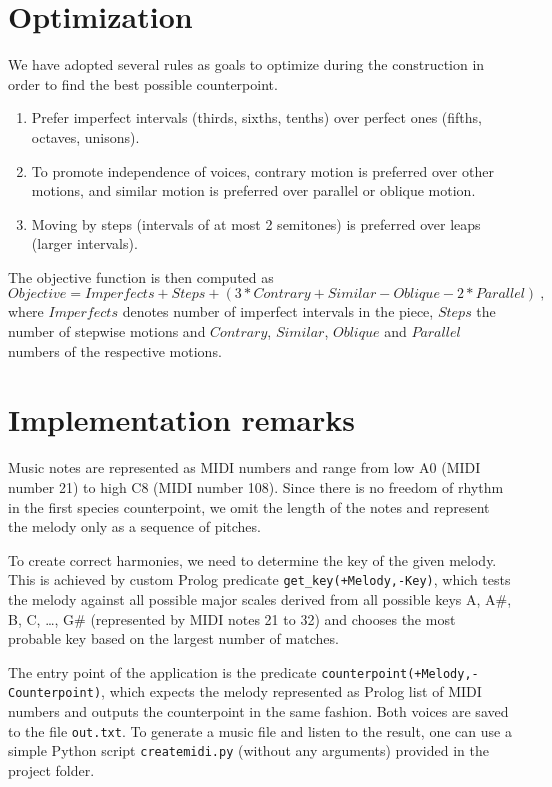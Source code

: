 \documentclass[11pt]{article} %
\begin{document}
\section{Optimization}
We have adopted several rules as goals to optimize during the construction in order to find the best possible counterpoint.
\begin{enumerate}
\leftskip=20pt
\item Prefer imperfect intervals (thirds, sixths, tenths) over perfect ones (fifths, octaves, unisons).

\item To promote independence of voices, contrary motion is preferred over other motions, and similar motion is preferred over parallel or oblique motion.

\item Moving by steps (intervals of at most 2 semitones) is preferred over leaps (larger intervals).
\end{enumerate}

\noindent The objective function is then computed as 
$$Objective = Imperfects + Steps + (3*Contrary + Similar - Oblique - 2*Parallel)\ ,$$
where $Imperfects$ denotes number of imperfect intervals in the piece, $Steps$ the number of stepwise motions and $Contrary$, $Similar$, $Oblique$ and $Parallel$ numbers of the respective motions.

\section{Implementation remarks}
Music notes are represented as MIDI numbers and range from low A0 (MIDI number 21) to high C8 (MIDI number 108). Since there is no freedom of rhythm in the first species counterpoint, we omit the length of the notes and represent the melody only as a sequence of pitches. 

To create correct harmonies, we need to determine the key of the given melody. This is achieved by custom Prolog predicate \texttt{get\_key(+Melody,-Key)}, which tests the melody against all possible major scales derived from all possible keys A, A\#, B, C, \dots , G\# (represented by MIDI notes 21 to 32) and chooses the most probable key based on the largest number of matches.

The entry point of the application is the predicate \texttt{counterpoint(+Melody,-Counterpoint)}, which expects the melody represented as Prolog list of MIDI numbers and outputs the counterpoint in the same fashion. Both voices are saved to the file \texttt{out.txt}. To generate a music file and listen to the result, one can use a simple Python script \texttt{createmidi.py} (without any arguments) provided in the project folder.
\end{document}
